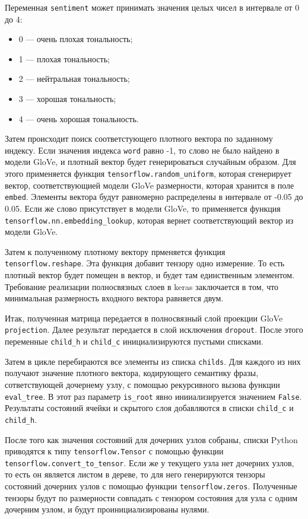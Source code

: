 Переменная \texttt{sentiment} может принимать значения целых чисел в интервале от 0 до 4:
\begin{itemize}
\item 0 --- очень плохая тональность;
\item 1 --- плохая тональность;
\item 2 --- нейтральная тональность;
\item 3 --- хорошая тональность;
\item 4 --- очень хорошая тональность.
\end{itemize}

Затем происходит поиск соответстующего плотного вектора по заданному индексу. Если значения индекса \texttt{word} равно -1, то слово не было найдено в модели GloVe, и плотный вектор будет генерироваться случайным образом. Для этого применяется функция \texttt{tensorflow.random\_uniform}, которая сгенерирует вектор, соответствующией модели GloVe размерности, которая хранится в поле \texttt{embed}. Элементы вектора будут равномерно распределены в интервале от -0.05 до 0.05. Если же слово присутствует в модели GloVe, то применяется функция \texttt{tensorflow.nn.embedding\_lookup}, которая вернет соответствующий вектор из модели GloVe.

Затем к полученному плотному вектору прменяется функция \texttt{tensorflow.reshape}. Эта функция добавит тензору одно измерение. То есть плотный вектор будет помещен в вектор, и будет там единственным элементом. Требование реализации полносвязных слоев в keras заключается в том, что минимальная размерность входного вектора равняется двум.

Итак, полученная матрица передается в полносвязный слой проекции GloVe \texttt{projection}. Далее результат передается в слой исключения \texttt{dropout}. После этого переменные \texttt{child\_h} и \texttt{child\_c} инициализируются пустыми списками.

Затем в цикле перебираются все элементы из списка \texttt{childs}. Для каждого из них получают значение плотного вектора, кодирующего семантику фразы, сответствующей дочернему узлу, с помощью рекурсивного вызова функции \texttt{eval\_tree}. В этот раз параметр \texttt{is\_root} явно инииализируется значением \texttt{False}. Результаты состояний ячейки и скрытого слоя добавляются в списки \texttt{child\_c} и \texttt{child\_h}.

После того как значения состояний для дочерних узлов собраны, списки Python приводятся к типу \texttt{tensorflow.Tensor} с помощью функции \texttt{tensorflow.convert\_to\_tensor}. Если же у текущего узла нет дочерних узлов, то есть он является листом в дереве, то для него генерируются тензоры состояний дочерних узлов с помощью функции \texttt{tensorflow.zeros}. Полученные тензоры будут по размерности совпадать с тензором состояния для узла с одним дочерним узлом, и будут проинициализированы нулями.


